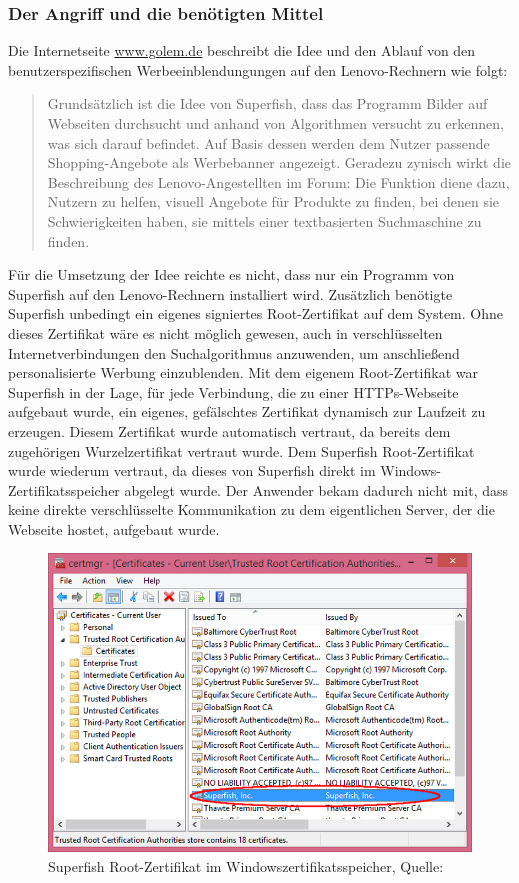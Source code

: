 \subsubsection{Der Angriff und die benötigten Mittel}
Die Internetseite \url{www.golem.de} beschreibt die Idee und den Ablauf von den benutzerspezifischen Werbeeinblendungungen auf den Lenovo-Rechnern wie folgt: 
\begin{quote}
	\glqq Grundsätzlich ist die Idee von Superfish, dass das Programm Bilder auf Webseiten durchsucht und anhand von Algorithmen versucht zu erkennen, was sich darauf befindet. Auf Basis dessen werden dem Nutzer passende Shopping-Angebote als Werbebanner angezeigt. Geradezu zynisch wirkt die Beschreibung des Lenovo-Angestellten im Forum: Die Funktion diene dazu, Nutzern zu helfen, visuell Angebote für Produkte zu finden, bei denen sie Schwierigkeiten haben, sie mittels einer textbasierten Suchmaschine zu finden.\grqq \cite{superfish}
\end{quote}
Für die Umsetzung der Idee reichte es nicht, dass nur ein Programm von Superfish auf den Lenovo-Rechnern installiert wird. Zusätzlich benötigte Superfish unbedingt ein eigenes signiertes Root-Zertifikat auf dem System. Ohne dieses Zertifikat wäre es nicht möglich gewesen, auch in verschlüsselten Internetverbindungen den Suchalgorithmus anzuwenden, um anschließend personalisierte Werbung einzublenden. Mit dem eigenem Root-Zertifikat war Superfish in der Lage, für jede Verbindung, die zu einer HTTPs-Webseite aufgebaut wurde, ein eigenes, gefälschtes Zertifikat dynamisch zur Laufzeit zu erzeugen. Diesem Zertifikat wurde automatisch vertraut, da bereits dem zugehörigen Wurzelzertifikat vertraut wurde. Dem Superfish Root-Zertifikat wurde wiederum vertraut, da dieses von Superfish direkt im Windows-Zertifikatsspeicher abgelegt wurde. Der Anwender bekam dadurch nicht mit, dass keine direkte verschlüsselte Kommunikation zu dem eigentlichen Server, der die Webseite hostet, aufgebaut wurde. 
\begin{figure}[H]
	\centering
	\includegraphics[width=.9\linewidth]{images/superfish.png}
	\caption{Superfish Root-Zertifikat im Windowszertifikatsspeicher, Quelle: \cite{superfish-bild}}
\end{figure}
